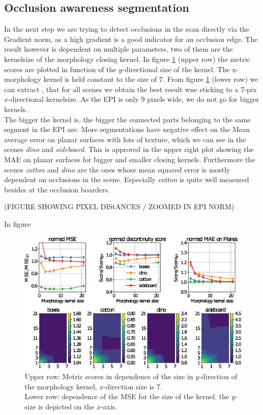 \documentclass  [
  paper    = a4,
  BCOR     = 10mm,
  twoside,
  fontsize = 12pt,
  fleqn,
  toc      = bibnumbered,
  toc      = listofnumbered,
  numbers  = noendperiod,
  headings = normal,
  listof   = leveldown,
  version  = 3.03
]                                       {scrreprt}
\begin{document}
\subsection{Occlusion awareness segmentation}
\label{sec:occlusionawareness}
In the next step we are trying to detect occlusions in the scan directly via the Gradient norm, as a high gradient is a good indicator for an occlusion edge. The result however is dependent on multiple parameters, two of them are the kernelsize of the morphology closing kernel. In figure \ref{fig:threshsegmmorph} (upper row) the metric scores are plotted in function of the $y$-directional size of the kernel. The x-morphology kernel is held constant to the size of 7. From figure \ref{fig:threshsegmmorph} (lower row) we can extract , that for all scenes we obtain the best result wne sticking to a 7-pix $x$-directional kernelsize. As the EPI is only 9 pixels wide, we do not go for bigger kernels.\\
The bigger the kernel is, the bigger the connected parts belonging to the same segment in the EPI are. More segmentations have negative effect on the Mean average error on planar surfaces with lots of texture, which we can see in the scenes \textit{dino} and \textit{sideboard}. This is approved in the upper right plot showing the MAE on planar surfaces for bigger and smaller closing kernels. Furthermore the scenes \textit{cotton} and \textit{dino} are the ones whose mean squared error is mostly dependent on occlusions in the scene. Especially \textit{cotton} is quite well measured besides at the occlusion boarders.

(FIGURE SHOWING PIXEL DIStANCES / ZOOMED IN EPI NORM)

In figure
\begin{figure}
	\centering
	\includegraphics[width=1\linewidth]{images/thresh_segm_morph}
	\caption[Segmentation of Epi dependence on the morphology kernel]{Upper row: Metric scores in dependence of the size in $y$-direction of the morphology kernel, $x$-direction size is 7.\\ Lower row: dependence of the MSE for the size of the kernel. the $y$-size is depicted on the $x$-axis.}
	\label{fig:threshsegmmorph}
\end{figure}
\end{document}
